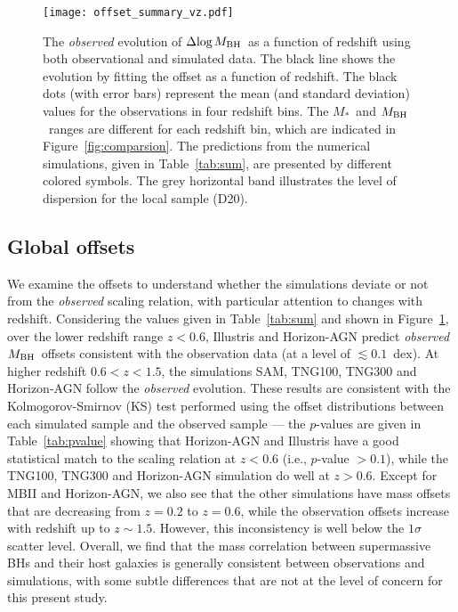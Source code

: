 \documentclass[twocolumn]{aastex631}
\def\smass{{$M_*$}}
\def\mbh{$M_{\rm BH}$}
\begin{document}
\begin{figure}
\centering
\texttt{[image: offset\_summary\_vz.pdf]}
\caption{\label{fig:offsets_vz} 
The {\it observed} evolution of $\Delta{\rm log}$\mbh\ as a function of redshift using both observational and simulated data. The black line shows the evolution by fitting the offset as a function of redshift. The black dots (with error bars) represent the mean (and standard deviation) values for the observations in four redshift bins. The \smass\ and \mbh\ ranges are different for each redshift bin, which are indicated in Figure~\ref{fig:comparsion}. The predictions from the numerical simulations, given in Table~\ref{tab:sum}, are presented by different colored symbols. The grey horizontal band illustrates the level of dispersion for the local sample (D20).
}
\end{figure} 

\subsection{Global offsets}\label{subsec:offset}
We examine the offsets to understand whether the simulations deviate or not from the {\it observed} scaling relation, with particular attention to changes with redshift. Considering the values given in Table~\ref{tab:sum} and shown in Figure~\ref{fig:offsets_vz}, over the lower redshift range $z<0.6$, Illustris and Horizon-AGN predict {\it observed} \mbh\ offsets consistent with the observation data (at a level of $\lesssim0.1$~dex). At higher redshift $0.6<z<1.5$, the simulations SAM, TNG100, TNG300 and Horizon-AGN follow the {\it observed} evolution. These results are consistent with the Kolmogorov-Smirnov (KS) test performed using the offset distributions between each simulated sample and the observed sample --- the $p$-values are given in Table~\ref{tab:pvalue} showing that Horizon-AGN and Illustris have a good statistical match to the scaling relation at $z<0.6$ (i.e., $p$-value $> 0.1$), while the TNG100, TNG300 and Horizon-AGN simulation do well at $z>0.6$. 
Except for MBII and Horizon-AGN, we also see that the other simulations have mass offsets that are decreasing from $z=0.2$ to $z=0.6$, while the observation offsets increase with redshift up to $z\sim1.5$. However, this inconsistency is well below the $1\sigma$ scatter level.
Overall, we find that the mass correlation between supermassive BHs and their host galaxies is generally consistent between observations and simulations, with some subtle differences that are not at the level of concern for this present study.
\end{document}
